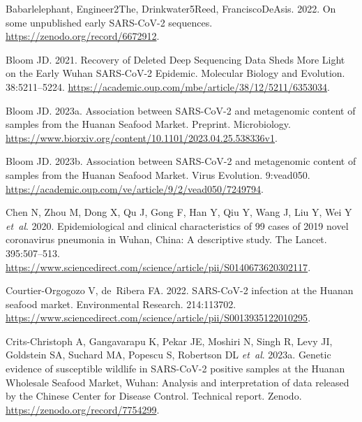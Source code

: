 \documentclass[11pt]{article}
\begin{document}
\begin{thebibliography}{24}

{{Babarlelephant}, {Engineer2The}, {Drinkwater5Reed}, {FranciscoDeAsis}}. 2022.
  On some unpublished early {{SARS-CoV-2}} sequences.
  \url{https://zenodo.org/record/6672912}.

{Bloom JD}. 2021. Recovery of {{Deleted Deep Sequencing Data Sheds More Light}}
  on the {{Early Wuhan SARS-CoV-2 Epidemic}}. Molecular Biology and Evolution.
  38:5211--5224. \url{https://academic.oup.com/mbe/article/38/12/5211/6353034}.

{Bloom JD}. 2023{a}. Association between {{SARS-CoV-2}} and metagenomic content
  of samples from the {{Huanan Seafood Market}}. Preprint. {Microbiology}.
  \url{https://www.biorxiv.org/content/10.1101/2023.04.25.538336v1}.

{Bloom JD}. 2023{b}. Association between {{SARS-CoV-2}} and metagenomic content
  of samples from the {{Huanan Seafood Market}}. Virus Evolution. 9:vead050.
  \url{https://academic.oup.com/ve/article/9/2/vead050/7249794}.

{Chen N, Zhou M, Dong X, Qu J, Gong F, Han Y, Qiu Y, Wang J, Liu Y, Wei Y {\em
  et~al\/}}. 2020. Epidemiological and clinical characteristics of 99 cases of
  2019 novel coronavirus pneumonia in {{Wuhan}}, {{China}}: A descriptive
  study. The Lancet. 395:507--513.
  \url{https://www.sciencedirect.com/science/article/pii/S0140673620302117}.

{{Courtier-Orgogozo} V, {{de}}~Ribera FA}. 2022. {{SARS-CoV-2}} infection at
  the {{Huanan}} seafood market. Environmental Research. 214:113702.
  \url{https://www.sciencedirect.com/science/article/pii/S0013935122010295}.

{{Crits-Christoph} A, Gangavarapu K, Pekar JE, Moshiri N, Singh R, Levy JI,
  Goldstein SA, Suchard MA, Popescu S, Robertson DL {\em et~al\/}}. 2023{a}.
  Genetic evidence of susceptible wildlife in {{SARS-CoV-2}} positive samples
  at the {{Huanan Wholesale Seafood Market}}, {{Wuhan}}: {{Analysis}} and
  interpretation of data released by the {{Chinese Center}} for {{Disease
  Control}}. Technical report. {Zenodo}.
  \url{https://zenodo.org/record/7754299}.


\end{thebibliography}
\end{document}
